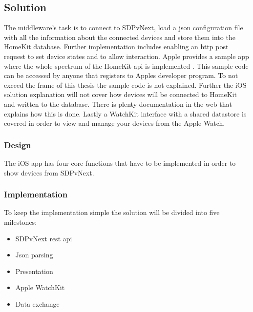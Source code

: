 




	\subsection{Solution} 
		The middleware's task is to connect to SDPvNext, load a json configuration file with all the information about the connected devices and store them into the HomeKit database. Further implementation includes enabling an http post request to set device states and to allow interaction. Apple provides a sample app where the whole spectrum of the HomeKit api is implemented \parencite{AppleHomeKitSample}. This sample code can be accessed by anyone that registers to Apples developer program. To not exceed the frame of this thesis the sample code is not explained. Further the iOS solution explanation will not cover how devices will be connected to HomeKit and written to the database. There is plenty documentation in the web that explains how this is done. Lastly a WatchKit interface with a shared datastore is covered in order to view and manage your devices from the Apple Watch. \\

		\subsubsection{Design}
			The iOS app has four core functions that have to be implemented in order to show devices from SDPvNext.
			
		\pagebreak
		\subsubsection{Implementation} 

			To keep the implementation simple the solution will be divided into five milestones:

			\begin{itemize}
				\item SDPvNext rest api
				\item Json parsing
				\item Presentation
				\item Apple WatchKit
				\item Data exchange
			\end{itemize}

